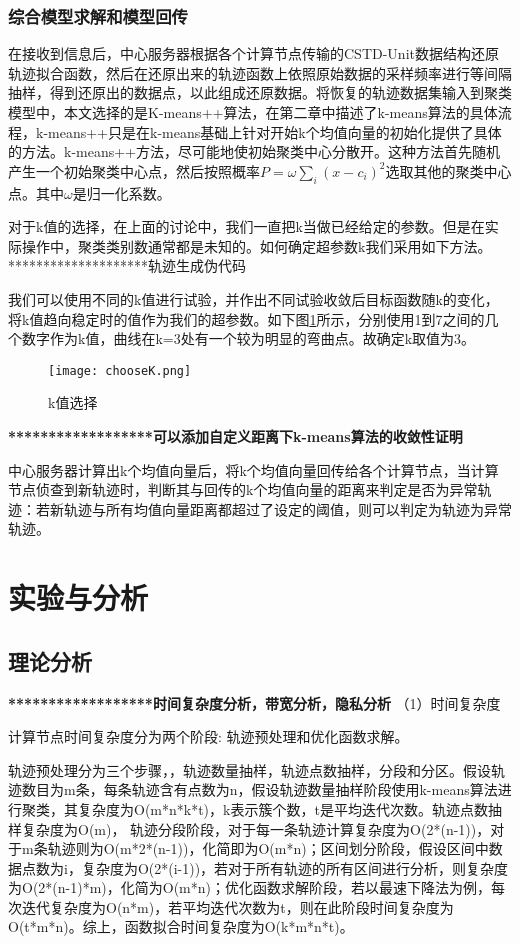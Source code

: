 \subsubsection{综合模型求解和模型回传}

在接收到信息后，中心服务器根据各个计算节点传输的CSTD-Unit数据结构还原轨迹拟合函数，然后在还原出来的轨迹函数上依照原始数据的采样频率进行等间隔抽样，得到还原出的数据点，以此组成还原数据。将恢复的轨迹数据集输入到聚类模型中，本文选择的是K-means++算法，在第二章中描述了k-means算法的具体流程，k-means++只是在k-means基础上针对开始k个均值向量的初始化提供了具体的方法。k-means++方法，尽可能地使初始聚类中心分散开。这种方法首先随机产生一个初始聚类中心点，然后按照概率$P=\omega \sum_i{\left( x-c_i \right) ^2}$选取其他的聚类中心点。其中$\omega$是归一化系数。

对于k值的选择，在上面的讨论中，我们一直把k当做已经给定的参数。但是在实际操作中，聚类类别数通常都是未知的。如何确定超参数k我们采用如下方法。\\
********************轨迹生成伪代码

我们可以使用不同的k值进行试验，并作出不同试验收敛后目标函数随k的变化，将k值趋向稳定时的值作为我们的超参数。如下图\ref{chooseK}所示，分别使用1到7之间的几个数字作为k值，曲线在k=3处有一个较为明显的弯曲点。故确定k取值为3。
\begin{figure}[h]
	\texttt{[image: chooseK.png]}
	\caption{k值选择}
	\label{chooseK}
\end{figure}

\textbf{******************可以添加自定义距离下k-means算法的收敛性证明}

中心服务器计算出k个均值向量后，将k个均值向量回传给各个计算节点，当计算节点侦查到新轨迹时，判断其与回传的k个均值向量的距离来判定是否为异常轨迹：若新轨迹与所有均值向量距离都超过了设定的阈值，则可以判定为轨迹为异常轨迹。


\section{实验与分析}
\subsection{理论分析}
\textbf{******************时间复杂度分析，带宽分析，隐私分析}
（1）时间复杂度

计算节点时间复杂度分为两个阶段: 轨迹预处理和优化函数求解。

轨迹预处理分为三个步骤，，轨迹数量抽样，轨迹点数抽样，分段和分区。假设轨迹数目为m条，每条轨迹含有点数为n，假设轨迹数量抽样阶段使用k-means算法进行聚类，其复杂度为O(m*n*k*t)，k表示簇个数，t是平均迭代次数。轨迹点数抽样复杂度为O(m)，
轨迹分段阶段，对于每一条轨迹计算复杂度为O(2*(n-1))，对于m条轨迹则为O(m*2*(n-1))，化简即为O(m*n)；区间划分阶段，假设区间中数据点数为i，复杂度为O(2*(i-1))，若对于所有轨迹的所有区间进行分析，则复杂度为O(2*(n-1)*m)，化简为O(m*n)；优化函数求解阶段，若以最速下降法为例，每次迭代复杂度为O(n*m)，若平均迭代次数为t，则在此阶段时间复杂度为O(t*m*n)。综上，函数拟合时间复杂度为O(k*m*n*t)。

